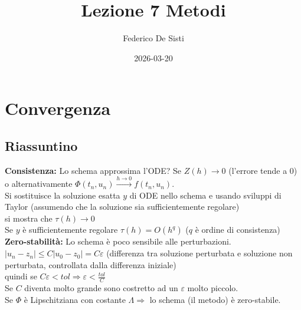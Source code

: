 \documentclass[12px]{article}
\title{Lezione 7 Metodi}
\date{2026-03-20}
\author{Federico De Sisti}
\begin{document}
	\maketitle
	\newpage
	\section{Convergenza}
	\subsection{Riassuntino}
	\textbf{Consistenza:} Lo schema approssima l'ODE? Se $Z(h) \rightarrow 0$ (l'errore tende a 0)\\
	o alternativamente $\Phi(t_n,u_n) \xrightarrow{h \rightarrow 0}f(t_n,u_n)$.\\
	Si sostituisce la soluzione esatta $y$ di ODE nello schema e usando sviluppi di Taylor (assumendo che la soluzione sia sufficientemente regolare)\\
	si mostra che  $\tau(h) \rightarrow 0$\\
	Se $y$ è sufficientemente regolare $\tau(h) = O(h^q)$ ($q$ è ordine di consistenza)\\[10px]
	\textbf{Zero-stabilità:} Lo schema è poco sensibile alle perturbazioni.\\
$|u_n-z_n|\leq C|u_0-z_0| = C\varepsilon$   (differenza  tra soluzione perturbata e soluzione non perturbata, controllata dalla differenza iniziale)\\
quindi se $C\varepsilon < tol \Rightarrow  \varepsilon < \frac{tol}C$ \\
Se $C$ diventa molto grande sono costretto ad un  $\varepsilon$ molto piccolo.\\
Se $\Phi$ è Lipschitziana con costante $\Lambda \Rightarrow $ lo schema (il metodo) è zero-stabile.\\
\end{document}
